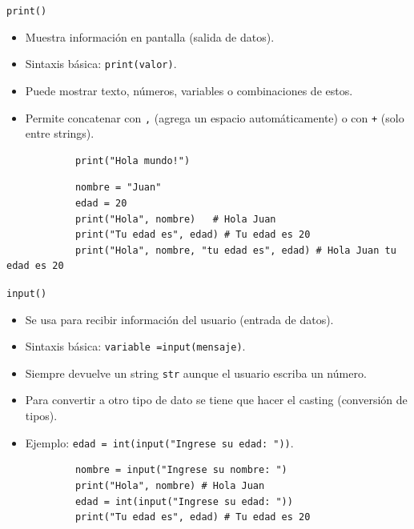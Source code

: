 \documentclass{beamer}
\begin{document}
    \begin{frame}[fragile,t]{\texttt{print()}}
        \begin{itemize}
            \item Muestra información en pantalla (salida de datos).
            \item Sintaxis básica: \texttt{print(valor)}.
            \item Puede mostrar texto, números, variables o combinaciones de estos.
            \item Permite concatenar con \texttt{,} (agrega un espacio automáticamente) o 
            con \texttt{+} (solo entre strings).
        \end{itemize}
        \begin{verbatim}
            print("Hola mundo!")
        \end{verbatim}
        \begin{verbatim}
            nombre = "Juan"
            edad = 20
            print("Hola", nombre)   # Hola Juan
            print("Tu edad es", edad) # Tu edad es 20
            print("Hola", nombre, "tu edad es", edad) # Hola Juan tu edad es 20
        \end{verbatim}
    \end{frame}

    \begin{frame}[fragile,t]{\texttt{input()}}
        \begin{itemize}
            \item Se usa para recibir información del usuario (entrada de datos).
            \item Sintaxis básica: \texttt{variable =input(mensaje)}.
            \item Siempre devuelve un string \texttt{str} aunque el usuario escriba un número.
            \item Para convertir a otro tipo de dato se tiene que hacer el casting (conversión de tipos).
            \item Ejemplo: \texttt{edad = int(input("Ingrese su edad: "))}.
        \end{itemize}
        \begin{verbatim}
            nombre = input("Ingrese su nombre: ")
            print("Hola", nombre) # Hola Juan
            edad = int(input("Ingrese su edad: "))
            print("Tu edad es", edad) # Tu edad es 20
        \end{verbatim}
    \end{frame}
\end{document}

